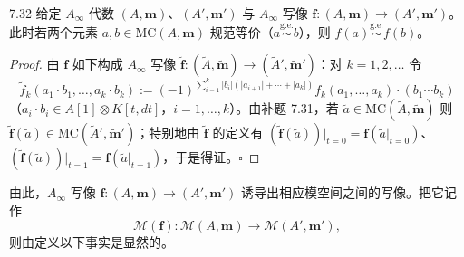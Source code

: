 \begin{proposition}{7.32}
给定 $A_\infty$ 代数 $(A,\mathbf m)$、$(A',\mathbf m')$ 与 $A_\infty$ 写像 $\mathbf f\colon(A,\mathbf m)\to(A',\mathbf m')$。此时若两个元素 $a,b\in\mathrm{MC}(A,\mathbf m)$ 规范等价（$a\overset{\mathrm{g.e.}}{\sim}b$），则 $f(a)\overset{\mathrm{g.e.}}{\sim}f(b)$。
\end{proposition}

\begin{proof}
由 $\mathbf f$ 如下构成 $A_\infty$ 写像 $\tilde{\mathbf f}\colon(\tilde A,\tilde{\mathbf m})\to(\tilde A',\tilde{\mathbf m}')$：对 $k=1,2,\dots$ 令
\[
  \tilde f_{k}(a_{1}\cdot b_{1},\dots,a_{k}\cdot b_{k}):=(-1)^{\sum_{i=1}^{k}|b_{i}|(|a_{i+1}|+\cdots+|a_{k}|)}f_{k}(a_{1},\dots,a_{k})\cdot(b_{1}\cdots b_{k})
\]
（$a_{i}\cdot b_{i}\in A[1]\otimes K[t,dt]$，$i=1,\dots,k$）。由补题 7.31，若 $\tilde a\in\mathrm{MC}(\tilde A,\tilde{\mathbf m})$ 则 $\tilde{\mathbf f}(\tilde a)\in\mathrm{MC}(\tilde A',\tilde{\mathbf m}')$；特别地由 $\tilde{\mathbf f}$ 的定义有 $(\tilde{\mathbf f}(\tilde a))|_{t=0}=\mathbf f(\tilde a|_{t=0})$、$(\tilde{\mathbf f}(\tilde a))|_{t=1}=\mathbf f(\tilde a|_{t=1})$，于是得证。\hfill$\square$
\end{proof}

由此，$A_\infty$ 写像 $\mathbf f\colon(A,\mathbf m)\to(A',\mathbf m')$ 诱导出相应模空间之间的写像。把它记作
\[
  \mathcal M(\mathbf f)\colon\mathcal M(A,\mathbf m)\longrightarrow\mathcal M(A',\mathbf m'),
\]
则由定义以下事实是显然的。
